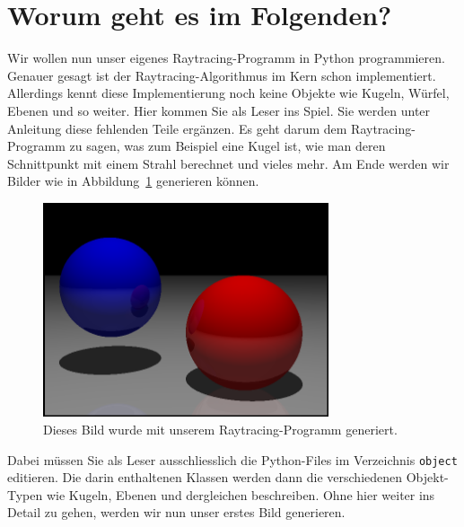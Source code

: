 \documentclass[12pt,a4paper]{article}
\theoremstyle{definition}
\theoremstyle{definition}
\begin{document}
	\section*{Worum geht es im Folgenden?}
	Wir wollen nun unser eigenes Raytracing-Programm in Python programmieren.
	Genauer gesagt ist der Raytracing-Algorithmus im Kern schon implementiert.
	Allerdings kennt diese Implementierung noch keine Objekte wie Kugeln, Würfel, Ebenen und so weiter.
	Hier kommen Sie als Leser ins Spiel.
	Sie werden unter Anleitung diese fehlenden Teile ergänzen.
	Es geht darum dem Raytracing-Programm zu sagen, was zum Beispiel eine Kugel ist, wie man deren Schnittpunkt mit einem Strahl berechnet und vieles mehr.
	Am Ende werden wir Bilder wie in Abbildung~\ref{fig:goal} generieren können.
	\begin{figure}[h!]
		\centering
		\includegraphics[width=0.75\textwidth]{images/image.png}
		\caption{Dieses Bild wurde mit unserem Raytracing-Programm generiert.}
		\label{fig:goal}
	\end{figure}
	Dabei müssen Sie als Leser ausschliesslich die Python-Files im Verzeichnis \texttt{object} editieren.
	Die darin enthaltenen Klassen werden dann die verschiedenen Objekt-Typen wie Kugeln, Ebenen und dergleichen beschreiben.
	Ohne hier weiter ins Detail zu gehen, werden wir nun unser erstes Bild generieren.
\end{document}
